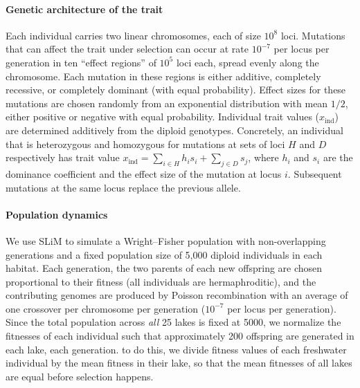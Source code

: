 \documentclass{article}
\begin{document}
\paragraph{Genetic architecture of the trait}
Each individual carries two linear chromosomes, each of size $10^8$ loci.
Mutations that can affect the trait under selection can occur at rate $10^{-7}$ per locus per generation
in ten ``effect regions'' of $10^5$ loci each,
spread evenly along the chromosome.
Each mutation in these regions is either additive, completely recessive, or completely dominant (with equal probability). 
Effect sizes for these mutations are chosen randomly from an exponential distribution with mean $1/2$, either positive or negative with equal probability. 
Individual trait values ($x_\text{ind}$) are determined additively from the diploid genotypes. 
Concretely, an individual that is heterozygous and homozygous for mutations at sets of loci $H$ and $D$ respectively has trait value 
$x_\text{ind} = \sum_{i \in H} h_i s_i + \sum_{j \in D} s_j$, 
where $h_i$ and $s_i$ are the dominance coefficient and the effect size of the mutation at locus $i$.
Subsequent mutations at the same locus replace the previous allele.

\paragraph{Population dynamics}
We use SLiM to simulate a Wright--Fisher population with non-overlapping generations 
and a fixed population size of 5,000 diploid individuals in each habitat.
Each generation, the two parents of each new offspring are chosen proportional to their fitness 
(all individuals are hermaphroditic),
and the contributing genomes are produced by Poisson recombination 
with an average of one crossover per chromosome per generation 
($10^{-7}$ per locus per generation). 
Since the total population across \emph{all} 25 lakes is fixed at 5000,
we normalize the fitnesses of each individual such that approximately 200 offspring are generated in each lake, each generation.
to do this, we divide fitness values of each freshwater individual by the mean fitness in their lake, 
so that the mean fitnesses of all lakes are equal before selection happens.
\end{document}
